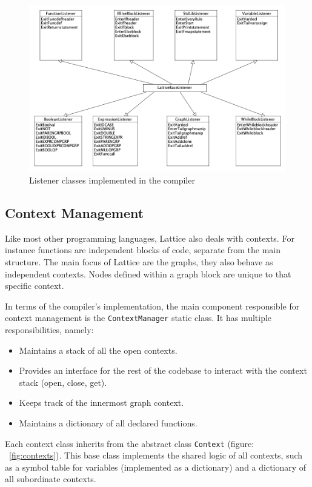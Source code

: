 \begin{figure}[H]
    \centering
    \includegraphics[width=12cm]{figures/implementation_section/listeners}
    \caption{Listener classes implemented in the compiler}
    \label{fig:listener_class_diagrams}
\end{figure}

\subsection{Context Management}
Like most other programming languages, Lattice also deals with contexts.
For instance functions are independent blocks of code, separate from the main structure.
The main focus of Lattice are the graphs, they also behave as independent contexts.
Nodes defined within a graph block are unique to that specific context.

In terms of the compiler's implementation, the main component responsible for context management is the
\lstinline{ContextManager} static class.
It has multiple responsibilities, namely:

\begin{itemize}
    \item Maintains a stack of all the open contexts.
    \item Provides an interface for the rest of the codebase to interact with the context stack (open, close, get).
    \item Keeps track of the innermost graph context.
    \item Maintains a dictionary of all declared functions.
\end{itemize}

Each context class inherits from the abstract class \lstinline{Context} (figure: ~\ref{fig:contexts}).
This base class implements the shared logic of all contexts, such as a symbol table for variables (implemented as a dictionary)
and a dictionary of all subordinate contexts.

